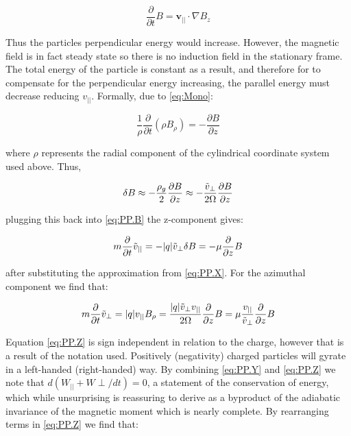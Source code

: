 \documentclass[utf8]{report}
\begin{document}
\begin{equation}
    \frac{\partial }{\partial t} B = \textbf{v}_{||} \cdot \nabla B_{z}
    \label{eq:PP.V}
\end{equation}

Thus the particles perpendicular energy would increase. However, the magnetic field is in fact steady state so there is no induction field in the stationary frame. The total energy of the particle is constant as a result, and therefore for to compensate for the perpendicular energy increasing, the parallel energy must decrease reducing $v_{||}$. Formally, due to \ref{eq:Mono}: 

\begin{equation}
    \frac{1}{\rho} \frac{\partial}{\partial t} (\rho B_{\rho}) = -\frac{\partial B}{\partial z}
    \label{eq:PP.W}
\end{equation}

where $\rho$ represents the radial component of the cylindrical coordinate system used above. Thus, 

\begin{equation}
    \delta B \approx - \frac{\rho_{g}}{2} \frac{\partial B}{\partial z} \approx - \frac{\Tilde{v}_{\perp}}{2\Omega} \frac{\partial B}{\partial z}
    \label{eq:PP.X}
\end{equation}

plugging this back into \ref{eq:PP.B} the z-component gives: 

\begin{equation}
    m \frac{\partial}{\partial t}\Tilde{v}_{||} = -|q| \Tilde{v}_{\perp} \delta B = -\mu \frac{\partial}{\partial z} B
    \label{eq:PP.Y}
\end{equation}

after substituting the approximation from \ref{eq:PP.X}. For the azimuthal component we find that: 

\begin{equation}
    m \frac{\partial}{\partial t}\Tilde{v}_{\perp} = |q| v_{||} B_{\rho} = \frac{|q|\Tilde{v}_{\perp} v_{||}}{2\Omega} \frac{\partial}{\partial z} B = \mu \frac{v_{||}}{\Tilde{v}_{\perp}} \frac{\partial}{\partial z} B
    \label{eq:PP.Z}
\end{equation}

Equation \ref{eq:PP.Z} is sign independent in relation to the charge, however that is a result of the notation used. Positively (negativity) charged particles will gyrate in a left-handed (right-handed) way. By combining \ref{eq:PP.Y} and \ref{eq:PP.Z} we note that $d(W_{||} + W{\perp} / dt) = 0$, a statement of the conservation of energy, which while unsurprising is reassuring to derive as a byproduct of the adiabatic invariance of the magnetic moment which is nearly complete. By rearranging terms in \ref{eq:PP.Z} we find that: 
\end{document}
